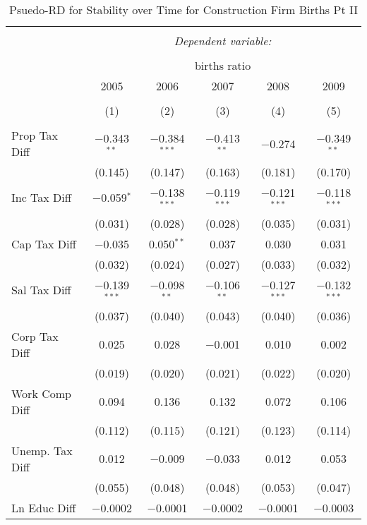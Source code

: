 
\begin{table}[!htbp] \centering 
  \caption{Psuedo-RD for Stability over Time for  Construction Firm Births Pt II} 
  \label{23year} 
\small 
\begin{tabular}{@{\extracolsep{5pt}}lccccc} 
\\[-1.8ex]\hline 
\hline \\[-1.8ex] 
 & \multicolumn{5}{c}{\textit{Dependent variable:}} \\ 
\cline{2-6} 
\\[-1.8ex] & \multicolumn{5}{c}{births ratio} \\ 
 & 2005 & 2006 & 2007 & 2008 & 2009 \\ 
\\[-1.8ex] & (1) & (2) & (3) & (4) & (5)\\ 
\hline \\[-1.8ex] 
 Prop Tax Diff & $-$0.343$^{**}$ & $-$0.384$^{***}$ & $-$0.413$^{**}$ & $-$0.274 & $-$0.349$^{**}$ \\ 
  & (0.145) & (0.147) & (0.163) & (0.181) & (0.170) \\ 
  Inc Tax Diff & $-$0.059$^{*}$ & $-$0.138$^{***}$ & $-$0.119$^{***}$ & $-$0.121$^{***}$ & $-$0.118$^{***}$ \\ 
  & (0.031) & (0.028) & (0.028) & (0.035) & (0.031) \\ 
  Cap Tax Diff & $-$0.035 & 0.050$^{**}$ & 0.037 & 0.030 & 0.031 \\ 
  & (0.032) & (0.024) & (0.027) & (0.033) & (0.032) \\ 
  Sal Tax Diff & $-$0.139$^{***}$ & $-$0.098$^{**}$ & $-$0.106$^{**}$ & $-$0.127$^{***}$ & $-$0.132$^{***}$ \\ 
  & (0.037) & (0.040) & (0.043) & (0.040) & (0.036) \\ 
  Corp Tax Diff & 0.025 & 0.028 & $-$0.001 & 0.010 & 0.002 \\ 
  & (0.019) & (0.020) & (0.021) & (0.022) & (0.020) \\ 
  Work Comp Diff & 0.094 & 0.136 & 0.132 & 0.072 & 0.106 \\ 
  & (0.112) & (0.115) & (0.121) & (0.123) & (0.114) \\ 
  Unemp. Tax Diff & 0.012 & $-$0.009 & $-$0.033 & 0.012 & 0.053 \\ 
  & (0.055) & (0.048) & (0.048) & (0.053) & (0.047) \\ 
  Ln Educ Diff & $-$0.0002 & $-$0.0001 & $-$0.0002 & $-$0.0001 & $-$0.0003 \\ 

\end{tabular}
\end{table}
